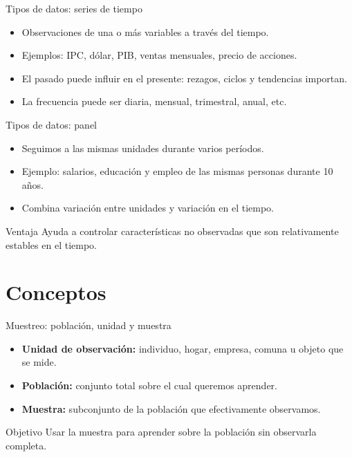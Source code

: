 \documentclass{beamer}
\begin{document}
\begin{frame}{Tipos de datos: series de tiempo}

\begin{itemize}
    \item Observaciones de una o más variables a través del tiempo.
    \item Ejemplos: IPC, dólar, PIB, ventas mensuales, precio de acciones.
    \item El pasado puede influir en el presente: rezagos, ciclos y tendencias importan.
    \item La frecuencia puede ser diaria, mensual, trimestral, anual, etc.
\end{itemize}

\end{frame}

\begin{frame}{Tipos de datos: panel}

\begin{itemize}
    \item Seguimos a las mismas unidades durante varios períodos.
    \item Ejemplo: salarios, educación y empleo de las mismas personas durante 10 años.
    \item Combina variación entre unidades y variación en el tiempo.
\end{itemize}

\begin{block}{Ventaja}
Ayuda a controlar características no observadas que son relativamente estables en el tiempo.
\end{block}
\end{frame}

\section{Conceptos } 

\begin{frame}{Muestreo: población, unidad y muestra}

\begin{itemize}
    \item {\bf Unidad de observación:} individuo, hogar, empresa, comuna u objeto que se mide.
    \item {\bf Población:} conjunto total sobre el cual queremos aprender.
    \item {\bf Muestra:} subconjunto de la población que efectivamente observamos.
\end{itemize}

\begin{block}{Objetivo}
Usar la muestra para aprender sobre la población sin observarla completa.
\end{block}
 
\end{frame}
\end{document}

